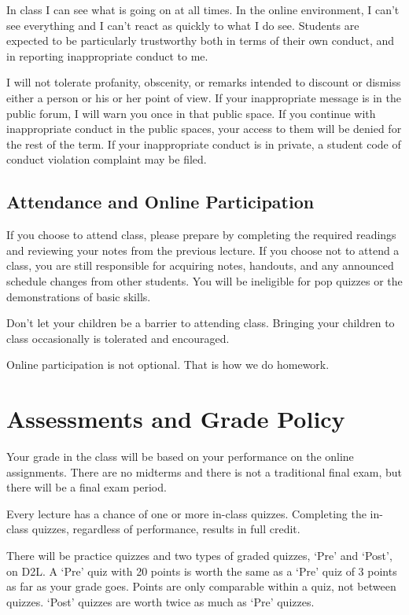 \documentclass[letterpaper,10pt]{article}
\begin{document}
In class I can see what is going on at all times.  In the online
environment, I can't see everything and I can't react as quickly to
what I do see.  Students are expected to be particularly trustworthy
both in terms of their own conduct, and in reporting inappropriate
conduct to me.

I will not tolerate profanity, obscenity, or remarks intended to
discount or dismiss either a person or his or her point of view. If your inappropriate message is in the public forum, I will warn you
once in that public space. If you continue with inappropriate conduct
in the public spaces, your access to them will be denied for the rest
of the term. If your inappropriate
conduct is in private, a student code of conduct violation complaint
may be filed.

\subsection{Attendance and Online Participation}

If you choose to attend class, please prepare by
completing the required readings and reviewing your notes from the
previous lecture. If you choose not to attend a class, you are still
responsible for acquiring notes, handouts, and any announced schedule
changes from other students.  You will be ineligible for pop quizzes
or the demonstrations of basic skills.

Don't let your children be a barrier to attending class. Bringing your
children to class occasionally is tolerated and encouraged.

Online participation is not optional.  That is how we do homework.

\section{Assessments and Grade Policy}

Your grade in the class will be based on your performance on the
online assignments.  There are no midterms and there is
not a traditional final exam, but there will be a final exam period.

Every lecture has a chance of one or more in-class quizzes. Completing the
in-class quizzes, regardless of performance, results in full credit.

There will be practice quizzes and two types of graded quizzes, `Pre' and `Post', on D2L.  A `Pre'
quiz with 20 points is worth the same as a `Pre' quiz of 3 points as
far as your grade goes.  Points are only comparable within a quiz, not
between quizzes.  `Post' quizzes are worth twice as much as `Pre' quizzes.
\end{document}
